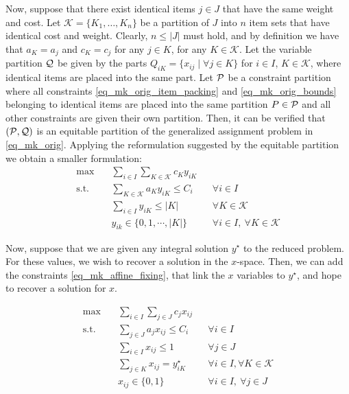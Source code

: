 \documentclass[pdflatex,sn-mathphys-num]{sn-jnl}%
\theoremstyle{thmstyleone}%
\theoremstyle{thmstylethree}%
\theoremstyle{thmstyletwo}%
\begin{document}
Now, suppose that there exist identical items $j\in J$ that have the same weight and cost. Let $\mathcal{K} = \{K_1,\dotsc, K_n\}$ be a partition of $J$ into $n$ item sets that have identical cost and weight. Clearly, $n \leq |J|$ must hold, and by definition we have that $a_K = a_j$ and $c_K = c_j$ for any $j\in K$, for any $K\in \mathcal{K}$. Let the variable partition $\mathcal{Q}$ be given by the parts $Q_{iK} = \{x_{ij} \mid \forall j\in K\}$ for $i\in I$, $K\in \mathcal{K}$, where identical items are placed into the same part. Let $\mathcal{P}$ be a constraint partition  where all constraints \eqref{eq_mk_orig_item_packing} and \eqref{eq_mk_orig_bounds} belonging to identical items are placed into the same partition $P\in \mathcal{P}$ and all other constraints are given their own partition. Then, it can be verified that $(\mathcal{P},\mathcal{Q})$ is an equitable partition of the generalized assignment problem in \eqref{eq_mk_orig}. Applying the reformulation suggested by the equitable partition we obtain a smaller formulation:
\begin{subequations}
\label{eq_mk_reduced}
\begin{align}
\max\quad & \sum_{i\in I}\sum_{K\in \mathcal{K}} c_K y_{iK} \\
\text{s.t.}\quad 
& \sum_{K\in \mathcal{K}} a_K y_{iK} \leq C_i 
&& \forall i\in I \label{eq_mk_reduced_knapsack}\\
& \sum_{i\in I} y_{iK} \leq |K| 
&& \forall K\in \mathcal{K} \\
& y_{ik} \in \{0,1,\cdots,|K|\} 
&& \forall i\in I,\ \forall K\in \mathcal{K}
\end{align}
\end{subequations}

Now, suppose that we are given any integral solution $y^\star$ to the reduced problem. For these values, we wish to recover a solution in the $x$-space. Then, we can add the constraints \eqref{eq_mk_affine_fixing}, that link the $x$ variables to $y^\star$, and hope to recover a solution for $x$.

\begin{subequations}
\label{eq_mk_affine}
\begin{align}
\max\quad & \sum_{i\in I}\sum_{j\in J} c_j x_{ij} \label{eq_mk_affine_fixing_obj}\\
\text{s.t.}\quad 
& \sum_{j\in J} a_j x_{ij} \leq C_i 
&& \forall i\in I \label{eq_mk_affine_fixing_knapsack}\\
& \sum_{i\in I} x_{ij} \leq 1 
&& \forall j\in J \\
& \sum_{j\in K} x_{ij} = y^{\star}_{iK} &&\forall i \in I, \forall K \in \mathcal{K} \label{eq_mk_affine_fixing}\\
& x_{ij} \in \{0,1\} 
&& \forall i\in I,\ \forall j\in J
\end{align}
\end{subequations}
\end{document}
